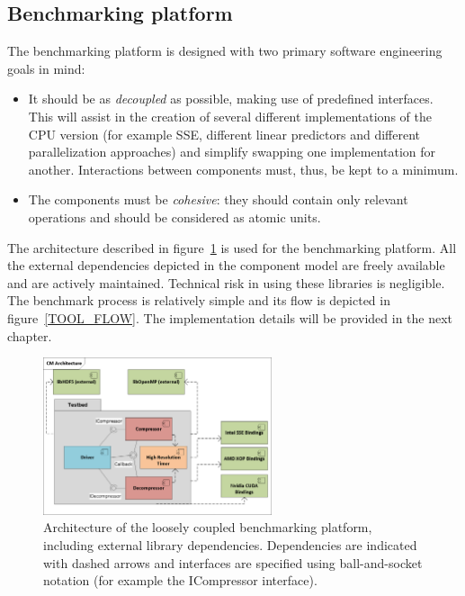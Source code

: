 \subsection{Benchmarking platform}
The benchmarking platform is designed with two primary software engineering goals in mind:
\begin{itemize}
 \item It should be as \textit{decoupled} as possible, making use of predefined interfaces. This will assist in the creation of several different implementations of the CPU 
 version (for example SSE, different linear predictors and different parallelization approaches) and simplify swapping one implementation for another. Interactions between 
 components must, thus, be kept to a minimum.
 \item The components must be \textit{cohesive}: they should contain only relevant operations and should be considered as atomic units.
\end{itemize}
The architecture described in figure~\ref{TOOL_ARCH} is used for the benchmarking platform. All the external dependencies depicted in the component model are freely available
and are actively maintained. Technical risk in using these libraries is negligible. The benchmark process is relatively simple and its flow is depicted in figure~\ref{TOOL_FLOW}.
The implementation details will be provided in the next chapter.
\begin{figure}[h!]
\begin{mdframed}
 \centering
 \includegraphics[width=0.6\textwidth]{Thesis_Arc.png}
 \caption[Component model of the benchmarking platform]{Architecture of the loosely coupled benchmarking platform, including external library dependencies. Dependencies are indicated with dashed arrows and interfaces
 are specified using ball-and-socket notation (for example the ICompressor interface).}
 \label{TOOL_ARCH}
\end{mdframed}
\end{figure}
